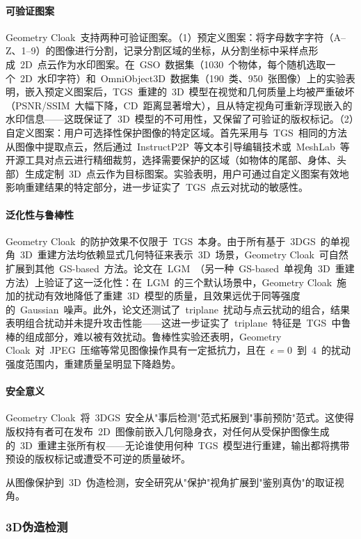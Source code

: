 \paragraph{可验证图案} Geometry Cloak~支持两种可验证图案。（1）预定义图案：将字母数字字符（A--Z、1--9）的图像进行分割，记录分割区域的坐标，从分割坐标中采样点形成~2D~点云作为水印图案。在~GSO~数据集（1030~个物体，每个随机选取一个~2D~水印字符）和~OmniObject3D~数据集（190~类、950~张图像）上的实验表明，嵌入预定义图案后，TGS~重建的~3D~模型在视觉和几何质量上均被严重破坏（PSNR/SSIM~大幅下降，CD~距离显著增大），且从特定视角可重新浮现嵌入的水印信息——这既保证了~3D~模型的不可用性，又保留了可验证的版权标记。（2）自定义图案：用户可选择性保护图像的特定区域。首先采用与~TGS~相同的方法从图像中提取点云，然后通过~InstructP2P~等文本引导编辑技术或~MeshLab~等开源工具对点云进行精细裁剪，选择需要保护的区域（如物体的尾部、身体、头部）生成定制~3D~点云作为目标图案。实验表明，用户可通过自定义图案有效地影响重建结果的特定部分，进一步证实了~TGS~点云对扰动的敏感性。

\paragraph{泛化性与鲁棒性} Geometry Cloak~的防护效果不仅限于~TGS~本身。由于所有基于~3DGS~的单视角~3D~重建方法均依赖显式几何特征来表示~3D~场景，Geometry Cloak~可自然扩展到其他~GS-based~方法。论文在~LGM~（另一种~GS-based~单视角~3D~重建方法）上验证了这一泛化性：在~LGM~的三个默认场景中，Geometry Cloak~施加的扰动有效地降低了重建~3D~模型的质量，且效果远优于同等强度的~Gaussian~噪声。此外，论文还测试了~triplane~扰动与点云扰动的组合，结果表明组合扰动并未提升攻击性能——这进一步证实了~triplane~特征是~TGS~中鲁棒的组成部分，难以被有效扰动。鲁棒性实验还表明，Geometry Cloak~对~JPEG~压缩等常见图像操作具有一定抵抗力，且在~$\epsilon = 0$~到~$4$~的扰动强度范围内，重建质量呈明显下降趋势。

\paragraph{安全意义} Geometry Cloak~将~3DGS~安全从"事后检测"范式拓展到"事前预防"范式。这使得版权持有者可在发布~2D~图像前嵌入几何隐身衣，对任何从受保护图像生成的~3D~重建主张所有权——无论谁使用何种~TGS~模型进行重建，输出都将携带预设的版权标记或遭受不可逆的质量破坏。

从图像保护到~3D~伪造检测，安全研究从"保护"视角扩展到"鉴别真伪"的取证视角。

\subsubsection{3D伪造检测}

